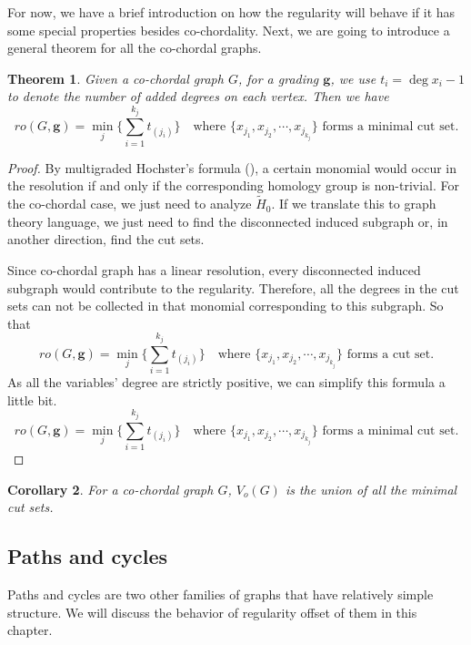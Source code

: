 \documentclass[dvipsnames,10pt]{article}
\newtheorem{theorem}{Theorem}[section]
\newtheorem{cor}[theorem]{Corollary}
\begin{document}
For now, we have a brief introduction on how the regularity will behave if it has some special properties besides co-chordality. Next, we are going to introduce a general theorem for all the co-chordal graphs.

\begin{theorem}
Given a co-chordal graph $G$, for a grading $\mathbf{g}$, we use $t_i=\deg x_i-1$ to denote the number of added degrees on each vertex. Then we have
\begin{equation*}
    ro(G,\mathbf{g})=\min_{j}\{\sum_{i=1}^{k_j}t_{(j_i)}\}\quad \text{where $\{x_{j_1},x_{j_2},\cdots,x_{j_{k_j}}\}$ forms a minimal cut set.}
\end{equation*}
\end{theorem}
\begin{proof}
    By multigraded Hochster's formula (), a certain monomial would occur in the resolution if and only if the corresponding homology group is non-trivial. For the co-chordal case, we just need to analyze $\widetilde{H}_{0}$. If we translate this to graph theory language, we just need to find the disconnected induced subgraph or, in another direction, find the cut sets.

    Since co-chordal graph has a linear resolution, every disconnected induced subgraph would contribute to the regularity. Therefore, all the degrees in the cut sets can not be collected in that monomial corresponding to this subgraph. So that
    \begin{equation*}
      ro(G,\mathbf{g})=\min_{j}\{\sum_{i=1}^{k_j}t_{(j_i)}\}\quad \text{where $\{x_{j_1},x_{j_2},\cdots,x_{j_{k_j}}\}$ forms a cut set.}  
    \end{equation*}
    As all the variables' degree are strictly positive, we can simplify this formula a little bit.
    \begin{equation*}
        ro(G,\mathbf{g})=\min_{j}\{\sum_{i=1}^{k_j}t_{(j_i)}\}\quad \text{where $\{x_{j_1},x_{j_2},\cdots,x_{j_{k_j}}\}$ forms a minimal cut set.}
    \end{equation*}
\end{proof}
\begin{cor}
    For a co-chordal graph $G$, $V_o(G)$ is the union of all the minimal cut sets.
\end{cor}


\subsection{Paths and cycles}
Paths and cycles are two other families of graphs that have relatively simple structure. We will discuss the behavior of regularity offset of them in this chapter. 
\end{document}
